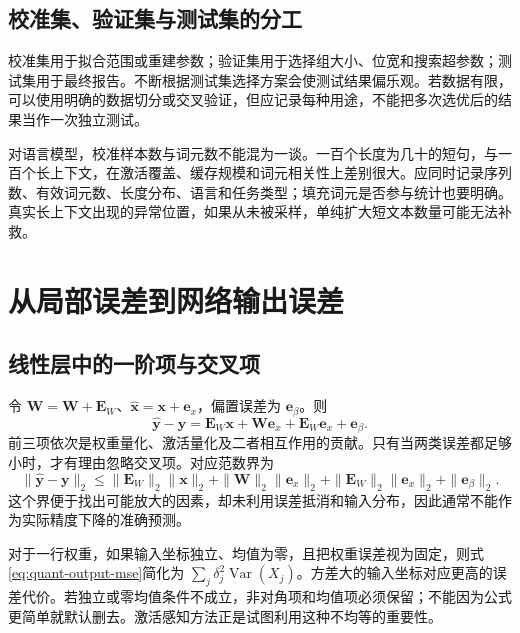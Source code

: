 \documentclass[UTF8,12pt,a4paper,fontset=fandol]{ctexart}
\begin{document}
\subsection{校准集、验证集与测试集的分工}
校准集用于拟合范围或重建参数；验证集用于选择组大小、位宽和搜索超参数；测试集用于最终报告。不断根据测试集选择方案会使测试结果偏乐观。若数据有限，可以使用明确的数据切分或交叉验证，但应记录每种用途，不能把多次选优后的结果当作一次独立测试。

对语言模型，校准样本数与词元数不能混为一谈。一百个长度为几十的短句，与一百个长上下文，在激活覆盖、缓存规模和词元相关性上差别很大。应同时记录序列数、有效词元数、长度分布、语言和任务类型；填充词元是否参与统计也要明确。真实长上下文出现的异常位置，如果从未被采样，单纯扩大短文本数量可能无法补救。

\section{从局部误差到网络输出误差}
\label{sec:quant-propagation}

\subsection{线性层中的一阶项与交叉项}
令 $\widehat{\mathbf W}=\mathbf W+\mathbf E_W$、$\widehat{\mathbf x}=\mathbf x+\mathbf e_x$，偏置误差为 $\mathbf e_\beta$。则
\begin{equation}
 \widehat{\mathbf y}-\mathbf y
 =\mathbf E_W\mathbf x+\mathbf W\mathbf e_x
 +\mathbf E_W\mathbf e_x+\mathbf e_\beta.
 \label{eq:quant-linear-error}
\end{equation}
前三项依次是权重量化、激活量化及二者相互作用的贡献。只有当两类误差都足够小时，才有理由忽略交叉项。对应范数界为
\[
 \|\widehat{\mathbf y}-\mathbf y\|_2
 \leq\|\mathbf E_W\|_2\|\mathbf x\|_2
 +\|\mathbf W\|_2\|\mathbf e_x\|_2
 +\|\mathbf E_W\|_2\|\mathbf e_x\|_2+\|\mathbf e_\beta\|_2.
\]
这个界便于找出可能放大的因素，却未利用误差抵消和输入分布，因此通常不能作为实际精度下降的准确预测。

对于一行权重，如果输入坐标独立、均值为零，且把权重误差视为固定，则式\eqref{eq:quant-output-mse}简化为 $\sum_j\delta_j^2\operatorname{Var}(X_j)$。方差大的输入坐标对应更高的误差代价。若独立或零均值条件不成立，非对角项和均值项必须保留；不能因为公式更简单就默认删去。激活感知方法正是试图利用这种不均等的重要性。
\end{document}
